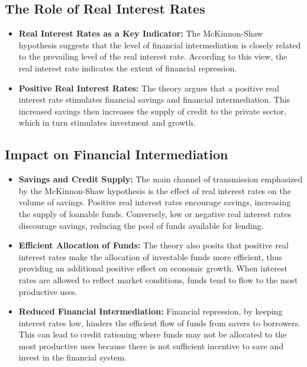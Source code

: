 \subsection{The Role of Real Interest Rates}
\begin{itemize}
    \item \textbf{Real Interest Rates as a Key Indicator:} The McKinnon-Shaw hypothesis suggests that the level of financial intermediation is closely related to the prevailing level of the real interest rate. According to this view, the real interest rate indicates the extent of financial repression.
    \item \textbf{Positive Real Interest Rates:} The theory argues that a positive real interest rate stimulates financial savings and financial intermediation. This increased savings then increases the supply of credit to the private sector, which in turn stimulates investment and growth.
\end{itemize}

\subsection{Impact on Financial Intermediation}
\begin{itemize}
    \item \textbf{Savings and Credit Supply:} The main channel of transmission emphasized by the McKinnon-Shaw hypothesis is the effect of real interest rates on the volume of savings. Positive real interest rates encourage savings, increasing the supply of loanable funds. Conversely, low or negative real interest rates discourage savings, reducing the pool of funds available for lending.
    \item \textbf{Efficient Allocation of Funds:} The theory also posits that positive real interest rates make the allocation of investable funds more efficient, thus providing an additional positive effect on economic growth. When interest rates are allowed to reflect market conditions, funds tend to flow to the most productive uses.
    \item \textbf{Reduced Financial Intermediation:} Financial repression, by keeping interest rates low, hinders the efficient flow of funds from savers to borrowers. This can lead to credit rationing where funds may not be allocated to the most productive uses because there is not sufficient incentive to save and invest in the financial system.
\end{itemize}

